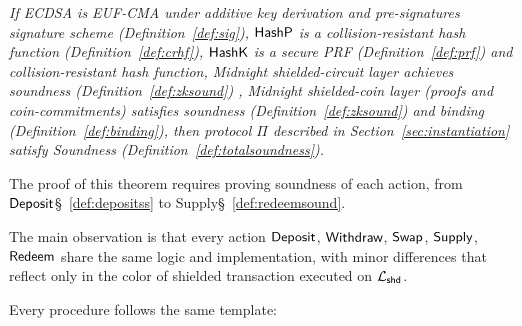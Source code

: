\begin{theorem}
\emph{If ECDSA is   EUF-CMA under additive key derivation and pre-signatures signature scheme (Definition~\ref{def:sig}),
$\mathsf{HashP}$ is a collision-resistant hash function (Definition~\ref{def:crhf}), $\mathsf{HashK}$ is a secure PRF (Definition~\ref{def:prf}) and collision-resistant hash function, Midnight shielded-circuit layer achieves soundness (Definition~\ref{def:zksound}) , Midnight shielded-coin layer (proofs and coin-commitments) satisfies soundness (Definition~\ref{def:zksound}) and binding  (Definition~\ref{def:binding}),  then protocol $\Pi$ described in Section~\ref{sec:instantiation} satisfy Soundness (Definition~\ref{def:totalsoundness}).}
\end{theorem}


The proof of this theorem requires proving  soundness of each action, from $\mathsf{Deposit}$\S~\ref{def:depositss} to  Supply\S~\ref{def:redeemsound}.

The main observation is that every action $\mathsf{Deposit}$, $\mathsf{Withdraw}$, $\mathsf{Swap}$, $\mathsf{Supply}$, $\mathsf{Redeem}$  share the same logic and implementation, with minor differences that reflect only in the color  of shielded transaction executed on $\mathcal{L}_{\mathsf{shd}}$.

Every procedure follows the same template:


